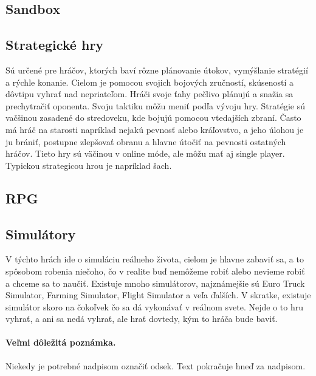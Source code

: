 \documentclass[10pt,twoside,slovak,a4paper]{coursepaper}
\begin{document}
\subsection{Sandbox} \label{zanre:sanbox}

\subsection{Strategické hry} \label{zanre:strategicke}

Sú určené pre hráčov, ktorých baví rôzne plánovanie útokov, vymýšlanie stratégií a rýchle konanie. Cielom je pomocou svojich bojových zručností, skúseností a dôvtipu vyhrať nad nepriateľom. Hráči svoje ťahy pečlivo plánujú a snažia sa prechytračiť oponenta. Svoju taktiku môžu meniť podľa vývoju hry. Stratégie sú vačšinou zasadené do stredoveku, kde bojujú pomocou vtedajších zbraní. Často má hráč na starosti napríklad nejakú pevnosť alebo kráľovstvo, a jeho úlohou je ju brániť, postupne zlepšovať obranu a hlavne útočiť na pevnosti ostatných hráčov. Tieto hry sú väčinou v online móde, ale môžu mať aj single player.  Typickou strategicou hrou je napríklad šach.

\subsection{RPG} \label{zanre:rpg}



\subsection{Simulátory} \label{zanre:simulatory}

V týchto hrách ide o simuláciu reálneho života, cielom je hlavne zabaviť sa, a to spôsobom robenia niečoho, čo v realite buď nemôžeme robiť alebo nevieme robiť a chceme sa to naučiť. Existuje mnoho simulátorov, najznámejšie sú Euro Truck Simulator, Farming Simulator, Flight Simulator a veľa ďalších. V skratke, existuje simulátor skoro na čokoľvek čo sa dá vykonávať v reálnom svete. Nejde o to hru vyhrať, a ani sa nedá vyhrať, ale hrať dovtedy, kým to hráča bude baviť.



\paragraph{Veľmi dôležitá poznámka.}
Niekedy je potrebné nadpisom označiť odsek. Text pokračuje hneď za nadpisom.
\end{document}
